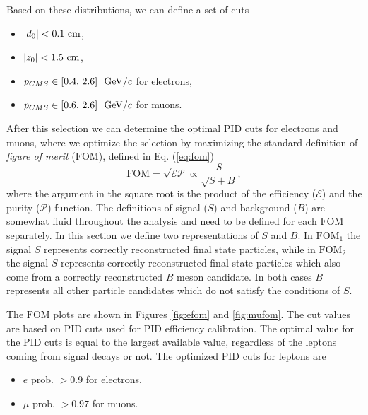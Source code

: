 Based on these distributions, we can define a set of cuts
\begin{itemize}
	\item $\vert d_0 \vert < 0.1\mathrm{~cm}$,
	\item $\vert z_0 \vert < 1.5\mathrm{~cm}$,
	\item $p_{CMS} \in [0.4,\,2.6]~\mathrm{~GeV}/c$ for electrons,
	\item $p_{CMS} \in [0.6,\,2.6]~\mathrm{~GeV}/c$ for muons.
\end{itemize}

After this selection we can determine the optimal PID cuts for electrons and muons, where we optimize the selection by maximizing the standard definition of \textit{figure of merit} ($\mathrm{FOM}$), defined in Eq. (\ref{eq:fom})
\begin{equation}
\label{eq:fom}
\mathrm{FOM} = \sqrt{\mathcal{E}\mathcal{P}} \propto \frac{S}{\sqrt{S+B}},
\end{equation} 
where the argument in the square root is the product of the efficiency ($\mathcal{E}$) and the purity ($\mathcal{P}$) function. The definitions of signal ($S$) and background ($B$) are somewhat fluid throughout the analysis and need to be defined for each $\mathrm{FOM}$ separately. In this section we define two representations of $S$ and $B$. In $\mathrm{FOM}_1$ the signal $S$ represents correctly reconstructed final state particles, while in $\mathrm{FOM}_2$ the signal $S$ represents correctly reconstructed final state particles which also come from a correctly reconstructed $B$ meson candidate. In both cases $B$ represents all other particle candidates which do not satisfy the conditions of $S$.

The $\mathrm{FOM}$ plots are shown in Figures \ref{fig:efom} and \ref{fig:mufom}. The cut values are based on PID cuts used for PID efficiency calibration. The optimal value for the PID cuts is equal to the largest available value, regardless of the leptons coming from signal decays or not. The optimized PID cuts for leptons are
\begin{itemize}
	\item $e$ prob. $ > 0.9$ for electrons,
	\item $\mu$ prob. $ > 0.97$ for muons.
\end{itemize}

